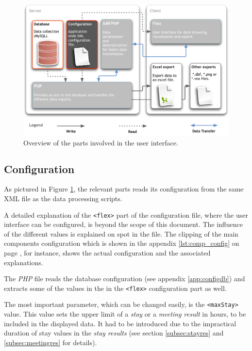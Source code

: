 \begin{figure}[htpb]
\begin{center}
  \includegraphics[width=\textwidth]{assets/pdf/application_design_miceminer.pdf}
  \caption[User Interface overview]{Overview of the parts involved in the user interface.}
  \label{fig:app_design_miceminer}
\end{center}
\end{figure}

\subsection{Configuration}
\label{subsec:miceminer_config}

As pictured in Figure \ref{fig:app_design_miceminer}, the relevant parts reads its configuration from the same XML file as the data processing scripts. 

A detailed explanation of the \lstinline|<flex>| part of the configuration file, where the user interface can be configured, is beyond the scope of this document. The influence of the different values is explained on spot in the file. The clipping of the main components configuration which is shown in the appendix \ref{lst:comp_config} on page \pageref{lst:comp_config}, for instance, shows the actual configuration and the associated explanations.

The \textit{PHP} file reads the database configuration (see appendix \ref{app:configdb}) and extracts some of the values in the in the \lstinline|<flex>| configuration part as well.

The most important parameter, which can be changed easily, is the \lstinline|<maxStay>| value. This value sets the upper limit of a \textit{stay} or a \textit{meeting result} in hours, to be included in the displayed data. It had to be introduced due to the impractical duration of stay values in the \textit{stay results} (see section \ref{subsec:stayres} and \ref{subsec:meetingres} for details).   

